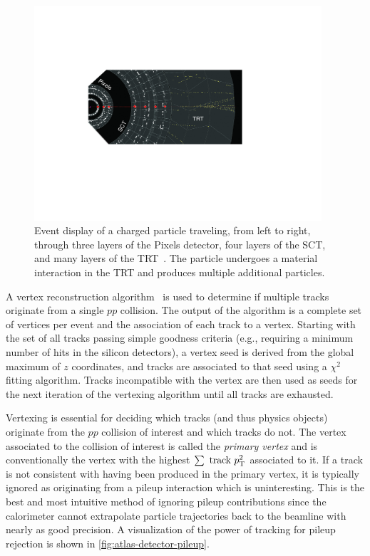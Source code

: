 \begin{figure}[tp]
  \centering
  \includegraphics[width=0.95\textwidth]{figures/lhc-atlas/detector-display-ID}
  \caption{Event display of a charged particle traveling, from left to right, through three layers of the Pixels detector, four layers of the SCT, and many layers of the TRT~\cite{SUSY-2011-14}. The particle undergoes a material interaction in the TRT and produces multiple additional particles.}
  \label{fig:atlas-detector-display-ID}
\end{figure}

A vertex reconstruction algorithm~\cite{ATLAS-CONF-2010-069,ATLAS-CONF-2012-042} is used to determine if multiple tracks originate from a single $pp$ collision. The output of the algorithm is a complete set of vertices per event and the association of each track to a vertex. Starting with the set of all tracks passing simple goodness criteria (e.g., requiring a minimum number of hits in the silicon detectors), a vertex seed is derived from the global maximum of $z$ coordinates, and tracks are associated to that seed using a $\chi^2$ fitting algorithm. Tracks incompatible with the vertex are then used as seeds for the next iteration of the vertexing algorithm until all tracks are exhausted. 

Vertexing is essential for deciding which tracks (and thus physics objects) originate from the $pp$ collision of interest and which tracks do not. The vertex associated to the collision of interest is called the \textit{primary vertex} and is conventionally the vertex with the highest $\sum\text{ track }p_{\mathrm{T}}^2$ associated to it. If a track is not consistent with having been produced in the primary vertex, it is typically ignored as originating from a pileup interaction which is uninteresting. This is the best and most intuitive method of ignoring pileup contributions since the calorimeter cannot extrapolate particle trajectories back to the beamline with nearly as good precision. A visualization of the power of tracking for pileup rejection is shown in \cref{fig:atlas-detector-pileup}.

